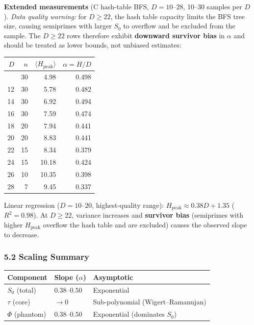 \documentclass[
  11pt,
]{article}
\begin{document}
\textbf{Extended measurements} (C hash-table BFS, \(D = 10\)--\(28\), 10--30
samples per \(D\)). \emph{Data quality warning:} for \(D \geq 22\), the hash
table capacity limits the BFS tree size, causing semiprimes with larger \(S_0\)
to overflow and be excluded from the sample. The \(D \geq 22\) rows therefore
exhibit \textbf{downward survivor bias} in \(\alpha\) and should be treated as
lower bounds, not unbiased estimates:

\begin{longtable}[]{@{}rrrr@{}}
\toprule\noalign{}
\(D\) & \(n\) & \(\langle H_{\text{peak}} \rangle\) & \(\alpha = H/D\) \\
\midrule\noalign{}
\endhead
\bottomrule\noalign{}
\endlastfoot
10 & 30 & 4.98 & 0.498 \\
12 & 30 & 5.78 & 0.482 \\
14 & 30 & 6.92 & 0.494 \\
16 & 30 & 7.59 & 0.474 \\
18 & 20 & 7.94 & 0.441 \\
20 & 20 & 8.83 & 0.441 \\
22 & 15 & 8.34 & 0.379 \\
24 & 15 & 10.18 & 0.424 \\
26 & 10 & 10.35 & 0.398 \\
28 & 7 & 9.45 & 0.337 \\
\end{longtable}

Linear regression (\(D = 10\)--\(20\), highest-quality range):
\(H_{\text{peak}} \approx 0.38 D + 1.35\) (\(R^2 = 0.98\)). At \(D \geq 22\),
variance increases and \textbf{survivor bias} (semiprimes with higher
\(H_{\text{peak}}\) overflow the hash table and are excluded) causes the
observed slope to decrease.

\subsubsection{5.2 Scaling Summary}\label{scaling-summary}

\begin{longtable}[]{@{}lll@{}}
\toprule\noalign{}
Component & Slope (\(\alpha\)) & Asymptotic \\
\midrule\noalign{}
\endhead
\bottomrule\noalign{}
\endlastfoot
\(S_0\) (total) & \(0.38\)--\(0.50\) & Exponential \\
\(\tau\) (core) & \(\to 0\) & Sub-polynomial (Wigert--Ramanujan) \\
\(\Phi\) (phantom) & \(0.38\)--\(0.50\) & Exponential (dominates \(S_0\)) \\
\end{longtable}
\end{document}
